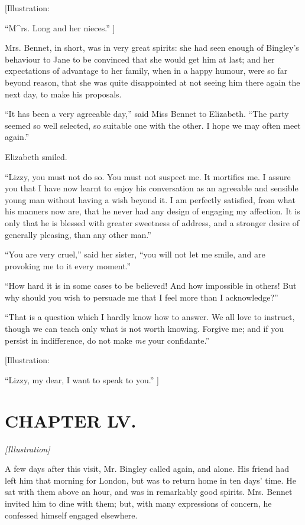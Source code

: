 \documentclass[12pt]{book}
\begin{document}
[Illustration:

``M^{rs}. Long and her nieces.'' ]

Mrs. Bennet, in short, was in very great spirits: she had seen enough of Bingley's behaviour to Jane to be convinced that she would get him at last; and her expectations of advantage to her family, when in a happy humour, were so far beyond reason, that she was quite disappointed at not seeing him there again the next day, to make his proposals.

``It has been a very agreeable day,'' said Miss Bennet to Elizabeth. ``The party seemed so well selected, so suitable one with the other. I hope we may often meet again.''

Elizabeth smiled.

``Lizzy, you must not do so. You must not suspect me. It mortifies me. I assure you that I have now learnt to enjoy his conversation as an agreeable and sensible young man without having a wish beyond it. I am perfectly satisfied, from what his manners now are, that he never had any design of engaging my affection. It is only that he is blessed with greater sweetness of address, and a stronger desire of generally pleasing, than any other man.''

``You are very cruel,'' said her sister, ``you will not let me smile, and are provoking me to it every moment.''

``How hard it is in some cases to be believed! And how impossible in others! But why should you wish to persuade me that I feel more than I acknowledge?''

``That is a question which I hardly know how to answer. We all love to instruct, though we can teach only what is not worth knowing. Forgive me; and if you persist in indifference, do not make \textit{me} your confidante.''

[Illustration:

``Lizzy, my dear, I want to speak to you.'' ]

\chapter{CHAPTER LV.}

\emph{[Illustration]}

A few days after this visit, Mr. Bingley called again, and alone. His friend had left him that morning for London, but was to return home in ten days' time. He sat with them above an hour, and was in remarkably good spirits. Mrs. Bennet invited him to dine with them; but, with many expressions of concern, he confessed himself engaged elsewhere.
\end{document}
